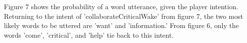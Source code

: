     Figure 7 shows the probability of a word utterance, given the player intention. Returning to the intent of 'collaborateCriticalWake' from figure 7, the two most likely words to be uttered are 'want' and 'information.' From figure 6, only the words 'come', 'critical', and 'help' tie back to this intent. 






